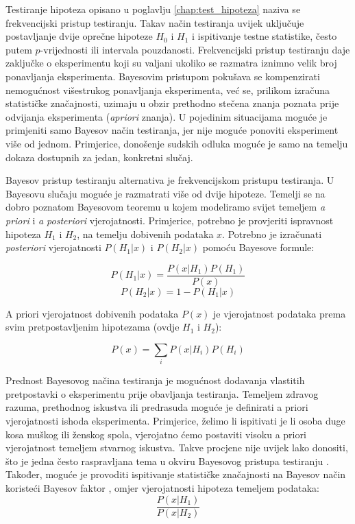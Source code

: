Testiranje hipoteza opisano u poglavlju \ref{chap:test_hipoteza} naziva se frekvencijski pristup testiranju. Takav način testiranja uvijek uključuje postavljanje dvije oprečne hipoteze $H_0$ i $H_1$ i ispitivanje testne statistike, često putem $p$-vrijednosti ili intervala pouzdanosti. Frekvencijski pristup testiranju daje zaključke o eksperimentu koji su valjani ukoliko se razmatra iznimno velik broj ponavljanja eksperimenta. Bayesovim pristupom pokušava se kompenzirati nemogućnost višestrukog ponavljanja eksperimenta, već se, prilikom izračuna statističke značajnosti, uzimaju u obzir prethodno stečena znanja poznata prije odvijanja eksperimenta (\textit{apriori} znanja). U pojedinim situacijama moguće je primjeniti samo Bayesov način testiranja, jer nije moguće ponoviti eksperiment više od jednom. Primjerice, donošenje sudskih odluka moguće je samo na temelju dokaza dostupnih za jedan, konkretni slučaj. 

Bayesov pristup testiranju alternativa je frekvencijskom pristupu testiranja. U Bayesovu slučaju moguće je razmatrati više od dvije hipoteze. Temelji se na dobro poznatom Bayesovom teoremu \citep{pawlak2002rough} u kojem modeliramo svijet temeljem \textit{a priori} i \textit{a posteriori} vjerojatnosti. Primjerice, potrebno je provjeriti ispravnost hipoteza $H_1$ i $H_2$, na temelju dobivenih podataka $x$. Potrebno je izračunati \textit{posteriori} vjerojatnosti $P(H_1|x)$ i $P(H_2|x)$ pomoću Bayesove formule:

\begin{center}
\begin{equation}
P(H_1|x) = \frac{P(x|H_1)P(H_1)}{P(x)}
\end{equation}
\begin{equation}
P(H_2|x) = 1 - P(H_1|x)
\end{equation}
\end{center}

A priori vjerojatnost dobivenih podataka $P(x)$ je vjerojatnost podataka prema svim pretpostavljenim hipotezama (ovdje $H_1$ i $H_2$):
\begin{center}
\begin{equation}
P(x) = \sum_i P(x|H_i)P(H_i)
\end{equation}
\end{center}

Prednost Bayesovog načina testiranja je mogućnost dodavanja vlastitih pretpostavki o eksperimentu prije obavljanja testiranja. Temeljem zdravog razuma, prethodnog iskustva ili predrasuda moguće je definirati a priori vjerojatnosti ishoda eksperimenta. Primjerice, želimo li ispitivati je li osoba duge kosa muškog ili ženskog spola, vjerojatno ćemo postaviti visoku a priori vjerojatnost temeljem stvarnog iskustva. Takve procjene nije uvijek lako donositi, što je jedna često raspravljana tema u okviru Bayesovog pristupa testiranju \citep{gelman2012philosophy}. Također, moguće je provoditi ispitivanje statističke značajnosti na Bayesov način koristeći Bayesov faktor , omjer vjerojatnosti hipoteza temeljem podataka:
\begin{equation}
\frac{P(x|H_1)}{P(x|H_2)}
\end{equation}

